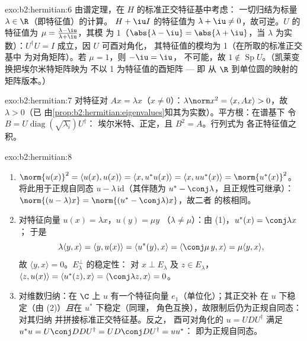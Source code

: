 \begin{solution}{exo:b2:hermitian:6}
由谱定理，在 $H$ 的标准正交特征基中考虑：
一切归结为标量 $\lambda \in \R$（即特征值）的计算。
$H + \iu I$ 的特征值为 $\lambda + \iu \neq 0$，故可逆。$U$
的特征值为 $\mu = \frac{\lambda - \iu}{\lambda + \iu}$，其模
为 $1$（$\abs{\lambda - \iu} = \abs{\lambda + \iu}$，当
$\lambda$ 为实数）：$U^\dagger U = I$ 成立，因 $U$ 可酉对角化，
其特征值的模均为 1（在所取的标准正交基中
为对角矩阵）。若 $\mu = 1$，则 $-\iu = \iu$，
不可能，故 $1 \notin \operatorname{Sp} U$。（凯莱变换把埃尔米特矩阵映为
不以 1 为特征值的酉矩阵 --- 即
从 $\R$ 到单位圆的映射的矩阵版本。）
\end{solution}

\begin{solution}{exo:b2:hermitian:7}
对特征对 $Ax = \lambda x$（$x \neq 0$）：$\lambda\norm x^2 =
\langle x, Ax\rangle > 0$，故 $\lambda > 0$（已
由\cref{prop:b2:hermitian:eigenvalues}知其为实数）。平方根：在谱基下
令 $B = U\operatorname{diag}(\sqrt{\lambda_i})U^\dagger$：
埃尔米特、正定，且 $B^2 = A$。行列式为
各正特征值之积。
\end{solution}

\begin{solution}{exo:b2:hermitian:8}
\begin{enumerate}
  \item $\norm{u(x)}^2 = \langle u(x), u(x)\rangle = \langle x,
        u^*u(x)\rangle = \langle x, uu^*(x)\rangle =
        \norm{u^*(x)}^2$。将此用于正规自同态 $u -
        \lambda\,\mathrm{id}$（其伴随为 $u^* -
        \conj\lambda$，且正规性可继承）：$\norm{(u -
        \lambda)x} = \norm{(u^* - \conj\lambda)x}$，故二者
        的核相同。
  \item 对特征向量 $u(x) = \lambda x$，$u(y) = \mu y$
        （$\lambda \neq \mu$）：由 (1)，$u^*(x) = \conj\lambda x$；
        于是
        \[
        \lambda\langle y, x\rangle = \langle y, u(x)\rangle
        = \langle u^*(y), x\rangle = \langle \conj\mu\, y, x\rangle
        = \mu \langle y, x\rangle ,
        \]
        故 $\langle y, x\rangle = 0$。$E_\lambda^\perp$ 的稳定性：
        对 $x \perp E_\lambda$ 及 $z \in E_\lambda$，$\langle z,
        u(x)\rangle = \langle u^*(z), x\rangle =
        \langle\conj\lambda z, x\rangle = 0$。
  \item 对维数归纳：在 $\C$ 上 $u$ 有一个特征向量
        $e_1$（单位化）；其正交补
        在 $u$ 下稳定（由 (2)）\emph{且}在 $u^*$ 下稳定（同理，
        角色互换），故限制后仍为正规自同态：对其归纳
        并拼接标准正交特征基。反之，
        酉可对角化的 $u = UDU^\dagger$ 满足 $u^*u
        = U\conj D D U^\dagger = U D\conj D U^\dagger = uu^*$：
        即为正规自同态。
\end{enumerate}
\end{solution}

